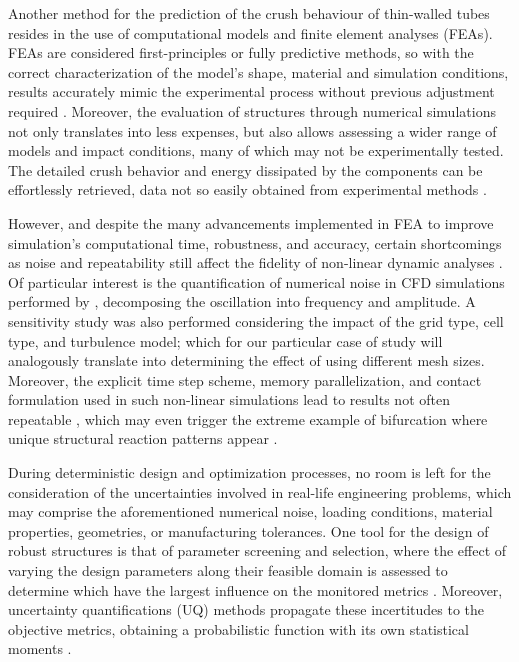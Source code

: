 \documentclass[12pt,number,preprint,review,times]{elsarticle}
\begin{document}
Another method for the prediction of the crush behaviour of thin-walled tubes resides in the use of computational models and finite element analyses (FEAs). FEAs are considered first-principles or fully predictive methods, so with the correct characterization of the model's shape, material and simulation conditions, results accurately mimic the experimental process without previous adjustment required \citep{noor1993computational}. Moreover, the evaluation of structures through numerical simulations not only translates into less expenses, but also allows assessing a wider range of models and impact conditions, many of which may not be experimentally tested. The detailed crush behavior and energy dissipated by the components can be effortlessly retrieved, data not so easily obtained from experimental methods \citep{altenhof2002experimental}.




However, and despite the many advancements implemented in FEA to improve simulation's computational time, robustness, and accuracy, certain shortcomings as noise and repeatability still affect the fidelity of non-linear dynamic analyses \citep{zhu2013lightweight}. Of particular interest is the quantification of numerical noise in CFD simulations performed by \citet{gilkeson_dealing_2014}, decomposing the oscillation into frequency and amplitude. A sensitivity study was also performed considering the impact of the grid type, cell type, and turbulence model; which for our particular case of study will analogously translate into determining the effect of using different mesh sizes. Moreover, the explicit time step scheme, memory parallelization, and contact formulation used in such non-linear simulations lead to results not often repeatable \citep{jeong2010non}, which may even trigger the extreme example of bifurcation where unique structural reaction patterns appear \citep{will_robustness_2006,duddeck_multidisciplinary_2008}.

During deterministic design and optimization processes, no room is left for the consideration of the uncertainties involved in real-life engineering problems, which may comprise the aforementioned numerical noise, loading conditions, material properties, geometries, or manufacturing tolerances. One tool for the design of robust structures is that of parameter screening and selection, where the effect of varying the design parameters along their feasible domain is assessed to determine which have the largest influence on the monitored metrics \citep{giannini_case_nodate,gao_sensitivity_2019}. Moreover, uncertainty quantifications (UQ) methods propagate these incertitudes to the objective metrics, obtaining a probabilistic function with its own statistical moments \citep{fang2017design}. 
\end{document}
